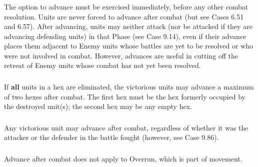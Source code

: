 \subsubsection{} The option to advance must be exercised immediately, before any other combat resolution. Units are never forced to advance after combat (but see Cases 6.51 and 6.57). After advancing, units may neither attack (nor be attacked if they are advancing defending units) in that Phase (see Case 9.14), even if their advance places them adjacent to Enemy units whose battles are yet to be resolved or who were not involved in combat. However, advances are useful in cutting off the retreat of Enemy units whose combat has not yet been resolved.

\subsubsection{} If \textbf{all} units in a hex are eliminated, the victorious units may advance a maximum of two hexes after combat. The first hex must be the hex formerly occupied by the destroyed unit(s); the second hex may be any empty hex.

\subsubsection{} Any victorious unit may advance after combat, regardless of whether it was the attacker or the defender in the battle fought (however, see Case 9.86).

\subsubsection{} Advance after combat does not apply to Overrun, which is part of movement.
